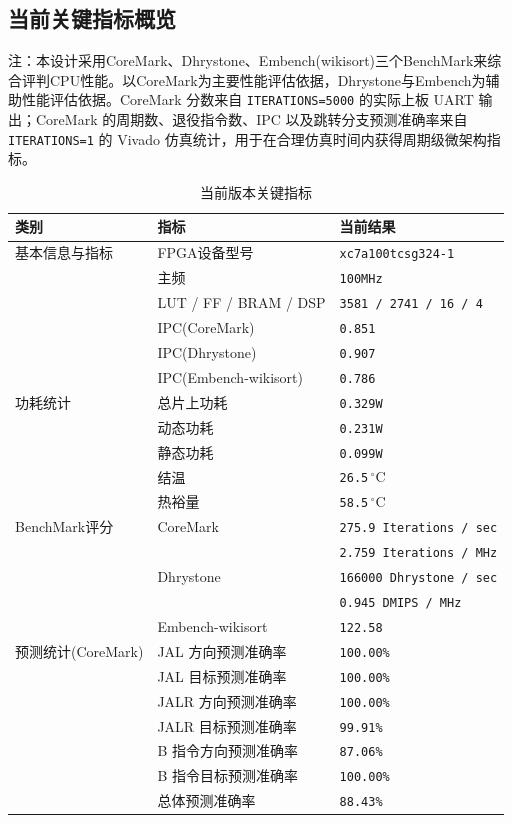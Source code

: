 ﻿\documentclass[12pt,a4paper]{ctexart}
\begin{document}
\subsection{当前关键指标概览}
注：本设计采用CoreMark、Dhrystone、Embench(wikisort)三个BenchMark来综合评判CPU性能。以CoreMark为主要性能评估依据，Dhrystone与Embench为辅助性能评估依据。CoreMark 分数来自 \texttt{ITERATIONS=5000} 的实际上板 UART 输出；CoreMark 的周期数、退役指令数、IPC 以及跳转分支预测准确率来自 \texttt{ITERATIONS=1} 的 Vivado 仿真统计，用于在合理仿真时间内获得周期级微架构指标。
\begin{table}[H]
      \centering
      \caption{当前版本关键指标}
      \begin{tabular}{lll}
          \toprule
          类别 & 指标 & 当前结果 \\
          \midrule
          基本信息与指标 & FPGA设备型号 & \texttt{xc7a100tcsg324-1}\\
           & 主频 & \texttt{100MHz} \\
           & LUT / FF / BRAM / DSP & \texttt{3581 / 2741 / 16 / 4} \\
           & IPC(CoreMark) & \texttt{0.851}\\
           & IPC(Dhrystone) & \texttt{0.907}\\
           & IPC(Embench-wikisort) & \texttt{0.786} \\
          \midrule
          功耗统计 & 总片上功耗 & \texttt{0.329W} \\
           & 动态功耗 & \texttt{0.231W} \\
           & 静态功耗 & \texttt{0.099W} \\
           & 结温 & \texttt{26.5}$\,^\circ\mathrm{C}$ \\
           & 热裕量 & \texttt{58.5}$\,^\circ\mathrm{C}$ \\
          \midrule
          BenchMark评分 & CoreMark & \texttt{275.9 Iterations / sec} \\
           &  & \texttt{2.759 Iterations / MHz} \\
           & Dhrystone & \texttt{166000 Dhrystone / sec}\\
 & &\texttt{0.945 DMIPS / MHz}\\
           & Embench-wikisort & \texttt{122.58} \\
          \midrule
          预测统计(CoreMark) & JAL 方向预测准确率 & \texttt{100.00\%} \\
           & JAL 目标预测准确率 & \texttt{100.00\%} \\
           & JALR 方向预测准确率 & \texttt{100.00\%}\\
           & JALR 目标预测准确率 & \texttt{99.91\%} \\
           & B 指令方向预测准确率 & \texttt{87.06\%} \\
           & B 指令目标预测准确率 & \texttt{100.00\%} \\
           & 总体预测准确率 & \texttt{88.43\%} \\
          \bottomrule
      \end{tabular}
  \end{table}
\end{document}
